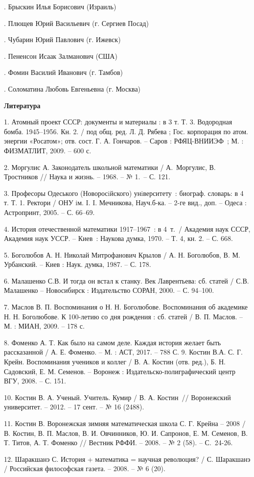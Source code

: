 .	Брыскин Илья Борисович (Израиль)

.	Плющев Юрий Васильевич (г. Сергиев Посад)

.	Чубарин Юрий Павлович (г. Ижевск)

.	Пененсон Исаак Залманович (США)

.	Фомин Василий Иванович (г. Тамбов)

.	Соломатина Любовь Евгеньевна (г. Москва)


\smallskip \centerline {\bf Литература} \nopagebreak

1.	Атомный проект СССР: документы и материалы : в 3 т. Т. 3. Водородная бомба. 1945–1956. Кн. 2. / под общ. ред. Л. Д. Рябева ; Гос. корпорация по атом. энергии «Росатом»; отв. сост. Г. А. Гончаров. – Саров : РФЯЦ-ВНИИЭФ~; М. : ФИЗМАТЛИТ, 2009. – 600 с.

2.	Моргулис А. Законодатель школьной математики / А.~Моргулис, В. Тростников // Наука и жизнь. – 1968. – № 1.~– С. 121.

3.	Професоры Одеського (Новоросiйского) унiверситету~: биограф. словарь:  в 4 т. Т. 1. Ректори / ОНУ iм. I. I. Мечникова, Науч.б-ка. – 2-ге вид., доп. – Одеса : Астропринт, 2005. – С. 66–69.

4.	История отечественной математики 1917–1967~: в 4~т.~/ Академия наук СССР, Академия наук УССР. – Киев~: Наукова думка, 1970. – Т. 4, кн. 2. – С. 668.

5.	Боголюбов А. Н. Николай Митрофанович Крылов / А. Н. Боголюбов, В. М. Урбанский. – Киев : Наук. думка, 1987. – С. 178.

6.	Малашенко С.В. И тогда он встал к станку. Век Лаврентьева: сб. статей / С.В. Малашенко – Новосибирск : Издательство СОРАН, 2000. –  С. 94–100.

7.	Маслов В. П. Воспоминания о Н. Н. Боголюбове. Воспоминания об академике Н. Н. Боголюбове. К 100-летию со дня рождения : сб. статей / В. П. Маслов. – М. : МИАН, 2009. – 178 с.

8.	Фоменко А. Т. Как было на самом деле. Каждая история желает быть рассказанной / А. Е. Фоменко. – М. : АСТ, 2017. – 788 С.
9.	Костин В.А.  С. Г. Крейн. Воспоминания учеников и коллег / В. А. Костин (отв. ред.), Б. Н. Садовский, Е. М. Семенов. – Воронеж : Издательско-полиграфический центр ВГУ, 2008. – С. 151.

10.	Костин В. А. Ученый. Учитель. Кумир / В. А. Костин~// Воронежский университет. – 2012. – 17 сент. – № 16 (2488).

11.	Костин В. Воронежская зимняя математическая школа С. Г. Крейна – 2008 / В. Костин, В. П. Маслов, В. И. Овчинников, Ю. И. Сапронов, Е. М. Семенов, В. Т. Титов, А. Т. Фоменко // Вестник РФФИ. – 2008. – № 2 (58). – С.~24-26.

12.	Шаракшанэ С. История + математика = научная революция? / С. Шаракшанэ / Российская философская газета. – 2008. – № 6 (20).

